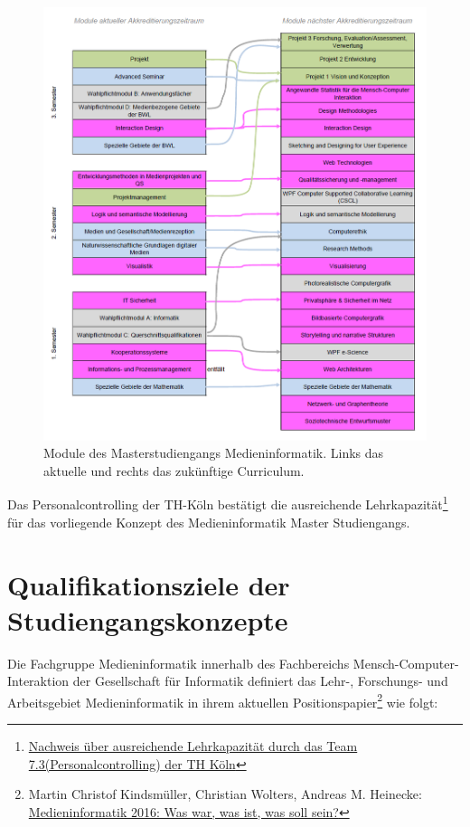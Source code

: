 \begin{figure}[htbp]
\centering
\includegraphics[width=\columnwidth]{../anhaenge/bilder/ma-mpo3-mpo4.png}
\caption{Module des Masterstudiengangs Medieninformatik. Links das
aktuelle und rechts das zukünftige Curriculum.}
\end{figure}

Das Personalcontrolling der TH-Köln bestätigt die ausreichende
Lehrkapazität\footnote{\href{https://th-koeln.github.io/mi-2017/anhaenge/th-verwaltung-kapa-nachweis.pdf}{Nachweis
  über ausreichende Lehrkapazität durch das Team
  7.3(Personalcontrolling) der TH Köln}} für das vorliegende Konzept des
Medieninformatik Master Studiengangs.

\chapter{Qualifikationsziele der
Studiengangskonzepte}\label{qualifikationsziele-der-studiengangskonzepte}

Die Fachgruppe Medieninformatik innerhalb des Fachbereichs
Mensch-Computer-Interaktion der Gesellschaft für Informatik definiert
das Lehr-, Forschungs- und Arbeitsgebiet Medieninformatik in ihrem
aktuellen Positionspapier\footnote{Martin Christof Kindsmüller,
  Christian Wolters, Andreas M. Heinecke:
  \href{http://dl.mensch-und-computer.de/bitstream/handle/123456789/5131/Kindsm\%C3\%BCller_Wolters_Heinecke_2016.pdf}{Medieninformatik
  2016: Was war, was ist, was soll sein?}} wie folgt:

